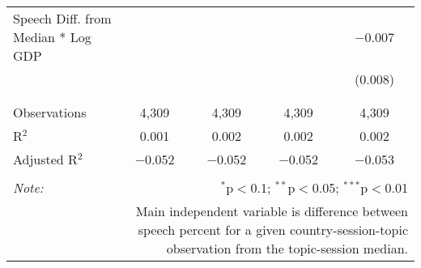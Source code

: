 \begin{table}[!htbp]
\begin{tabular}{@{\extracolsep{5pt}}lcccc}
 Speech Diff. from Median * Log GDP &  &  &  & $-$0.007 \\ 
  &  &  &  & (0.008) \\ 
  & & & & \\ 
\hline \\[-1.8ex] 
Observations & 4,309 & 4,309 & 4,309 & 4,309 \\ 
R$^{2}$ & 0.001 & 0.002 & 0.002 & 0.002 \\ 
Adjusted R$^{2}$ & $-$0.052 & $-$0.052 & $-$0.052 & $-$0.053 \\ 
\hline 
\hline \\[-1.8ex] 
\textit{Note:}  & \multicolumn{4}{r}{$^{*}$p$<$0.1; $^{**}$p$<$0.05; $^{***}$p$<$0.01} \\ 
 & \multicolumn{4}{r}{Main independent variable is difference between speech percent for a given country-session-topic observation from the topic-session median.} \\ 
\end{tabular} 
\end{table} 
